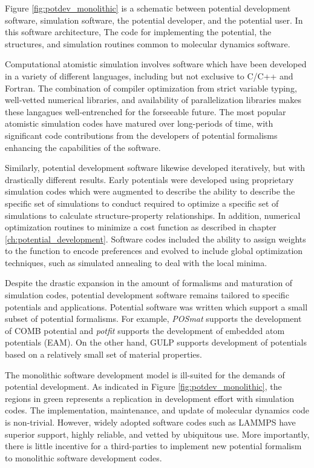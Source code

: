Figure \ref{fig:potdev_monolithic} is a schematic between potential development software, simulation software, the potential developer, and the potential user.  In this software architecture, The code for implementing the potential, the structures, and simulation routines common to molecular dynamics software.

Computational atomistic simulation involves software which have been developed in a variety of different languages, including but not exclusive to C/C++ and Fortran.  The combination of compiler optimization from strict variable typing, well-vetted numerical libraries, and availability of parallelization libraries makes these langagues well-entrenched for the forseeable future.  The most popular atomistic simulation codes have matured over long-periods of time, with significant code contributions from the developers of potential formalisms enhancing the capabilities of the software.

Similarly, potential development software likewise developed iteratively, but with drastically different results.  Early potentials were developed using proprietary simulation codes which were augmented to describe the ability to describe the specific set of simulations to conduct required to optimize a specific set of simulations to calculate structure-property relationships.   In addition, numerical optimization routines to minimize a cost function as described in chapter \ref{ch:potential_development}.  Software codes included the ability to assign weights to the function to encode preferences and evolved to include global optimization techniques, such as simulated annealing\cite{kirkpatrick1983_simmulated_annealing} to deal with the local minima.

Despite the drastic expansion in the amount of formalisms and maturation of simulation codes, potential development software remains tailored to specific potentials and applications.  Potential software was written which support a small subset of potential formalisms.  For example, \emph{POSmat}\cite{martinez2016_posmat} supports the development of COMB potential and \emph{potfit}\cite{brommer2015_potfit} supports the development of embedded atom potentials (EAM).  On the other hand, GULP supports development of potentials based on a relatively small set of material properties.

The monolithic software development model is ill-suited for the demands of potential development.  As indicated in Figure \ref{fig:potdev_monolithic}, the regions in green represents a replication in development effort with simulation codes.  The implementation, maintenance, and update of molecular dynamics code is non-trivial.  However, widely adopted software codes such as LAMMPS have superior support, highly reliable, and vetted by ubiquitous use.  More importantly,  there is little incentive for a third-parties to implement new potential formalism to monolithic software development codes.

